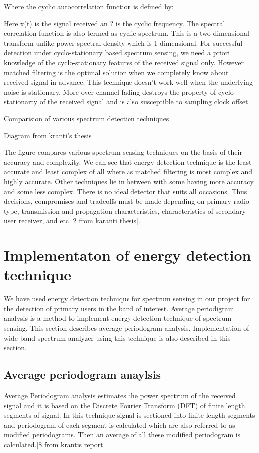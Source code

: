 Where the cyclic autocorrelation function is defined by:

Here x(t) is the signal received an ? is the cyclic frequency. The spectral 
correlation function is also termed as cyclic spectrum.
This is a two dimensional transform unlike power spectral density which is 1 
dimensional. For successful detection under cyclo-stationary based spectrum 
sensing, we need a priori knowledge of the cyclo-stationary features of the 
received signal only. However matched filtering is the optimal solution when we 
completely know about received signal in advance.
This technique doesn't work well when the underlying noise is stationary. More 
over channel fading destroys the property of cyclo stationarty of the received 
signal and is also susceptible to sampling clock offset. 

Comparision of various spectrum detection techniques

Diagram from kranti's thesis 









The figure compares various spectrum sensing techniques on the basis of their 
accuracy and complexity. We can see that energy detection technique is the least
accurate and least complex of all where as matched filtering is most complex and
highly accurate. Other techniques lie in between with some having more accuracy 
and some less complex. There is no ideal detector that suits all occasions. Thus
decisions, compromises and tradeoffs must be made depending on primary radio 
type, transmission and propagation characteristics, characteristics of secondary
user receiver, and etc [2 from karanti thesis].

\section{Implementaton of energy detection technique}
We have used energy detection technique for spectrum sensing in our project for 
the detection of primary users in the band of interest. Average periodigram 
analysis is a method to implement energy detection technique of spectrum 
sensing. This section describes average periodogram analysis.  Implementation of
wide band spectrum analyzer using this technique is also described in this 
section.

\subsection{Average periodogram anaylsis}
Average Periodogram analysis estimates the power spectrum of the received signal
and it is based on the Discrete Fourier Transform (DFT) of finite length 
segments of signal. In this technique signal is sectioned into finite length 
segments and periodogram of each segment is calculated which are also referred 
to as modified periodograms. Then an average of all these modified periodogram 
is calculated.[8 from krantis report]

